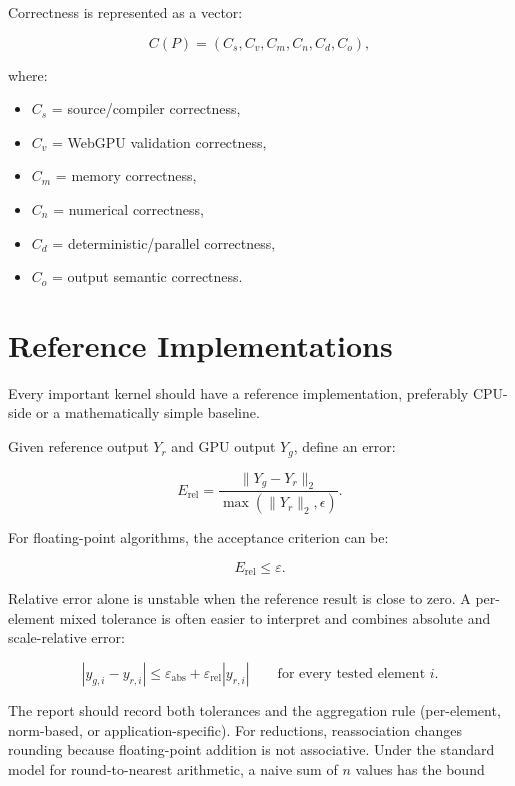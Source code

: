\documentclass[11pt,a4paper,oneside]{report}
\begin{document}
Correctness is represented as a vector:

\begin{equation}
C(P)=
(C_s,C_v,C_m,C_n,C_d,C_o),
\end{equation}

where:

\begin{itemize}
  \item $C_s$ = source/compiler correctness,
  \item $C_v$ = WebGPU validation correctness,
  \item $C_m$ = memory correctness,
  \item $C_n$ = numerical correctness,
  \item $C_d$ = deterministic/parallel correctness,
  \item $C_o$ = output semantic correctness.
\end{itemize}

\section{Reference Implementations}

Every important kernel should have a reference implementation, preferably CPU-side or a
mathematically simple baseline.

Given reference output $Y_r$ and GPU output $Y_g$, define an error:

\begin{equation}
E_{\mathrm{rel}}
=
\frac{\|Y_g-Y_r\|_2}
{\max(\|Y_r\|_2,\epsilon)}.
\end{equation}

For floating-point algorithms, the acceptance criterion can be:

\begin{equation}
E_{\mathrm{rel}}\le\varepsilon.
\end{equation}

Relative error alone is unstable when the reference result is close to zero. A per-element mixed
tolerance is often easier to interpret and combines absolute and scale-relative error:

\begin{equation}
|y_{g,i}-y_{r,i}|
\le \varepsilon_{\mathrm{abs}}
+\varepsilon_{\mathrm{rel}}|y_{r,i}|
\qquad\text{for every tested element }i.
\end{equation}

The report should record both tolerances and the aggregation rule (per-element, norm-based, or
application-specific). For reductions, reassociation changes rounding because floating-point
addition is not associative. Under the standard model for round-to-nearest arithmetic, a naive
sum of $n$ values has the bound
\end{document}

